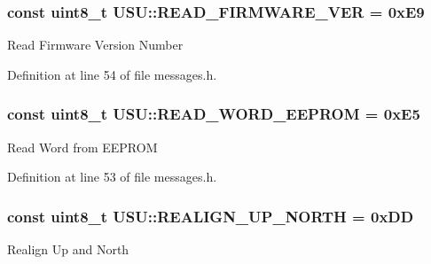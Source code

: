 \hypertarget{namespace_u_s_u_a7d0e77d37d6107d2869c30f57412e8b0}{
\subsubsection[{\-R\-E\-A\-D\-\_\-\-F\-I\-R\-M\-W\-A\-R\-E\-\_\-\-V\-E\-R}]{\setlength{\rightskip}{0pt plus 5cm}const uint8\-\_\-t {\bf \-U\-S\-U\-::\-R\-E\-A\-D\-\_\-\-F\-I\-R\-M\-W\-A\-R\-E\-\_\-\-V\-E\-R} = 0x\-E9}}\label{namespace_u_s_u_a7d0e77d37d6107d2869c30f57412e8b0}
\-Read \-Firmware \-Version \-Number 

\-Definition at line 54 of file messages.\-h.

\hypertarget{namespace_u_s_u_ac9d01a02c622d06449580697749db1f5}{
\subsubsection[{\-R\-E\-A\-D\-\_\-\-W\-O\-R\-D\-\_\-\-E\-E\-P\-R\-O\-M}]{\setlength{\rightskip}{0pt plus 5cm}const uint8\-\_\-t {\bf \-U\-S\-U\-::\-R\-E\-A\-D\-\_\-\-W\-O\-R\-D\-\_\-\-E\-E\-P\-R\-O\-M} = 0x\-E5}}\label{namespace_u_s_u_ac9d01a02c622d06449580697749db1f5}
\-Read \-Word from \-E\-E\-P\-R\-O\-M 

\-Definition at line 53 of file messages.\-h.

\hypertarget{namespace_u_s_u_a9c5f8777b9c35aaaa0b64490d1f9a20d}{
\subsubsection[{\-R\-E\-A\-L\-I\-G\-N\-\_\-\-U\-P\-\_\-\-N\-O\-R\-T\-H}]{\setlength{\rightskip}{0pt plus 5cm}const uint8\-\_\-t {\bf \-U\-S\-U\-::\-R\-E\-A\-L\-I\-G\-N\-\_\-\-U\-P\-\_\-\-N\-O\-R\-T\-H} = 0x\-D\-D}}\label{namespace_u_s_u_a9c5f8777b9c35aaaa0b64490d1f9a20d}
\-Realign \-Up and \-North 

